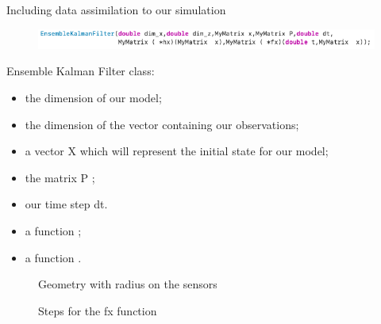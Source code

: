 \begin{frame}[allowframebreaks]{Including data assimilation to our simulation}
\begin{minipage}{1\linewidth}
    \begin{figure}
        \centering
        \includegraphics[width=\linewidth]{"images/enkf/enkf.png"}
    \end{figure}
\end{minipage}
Ensemble Kalman Filter class:
\begin{itemize}
    \item the dimension of our model;
    \item the dimension of the vector containing our observations;
    \item a vector X which will represent the initial state for our model;
    \item the matrix P ;
    \item our time step dt. 
    \item a function ;
    \item a function .

\end{itemize}
\newpage
\begin{minipage}{0.4\hsize}
			\centering
		\begin{figure}[H]
		\caption{Geometry with radius on the sensors}
	\end{figure}
		\end{minipage} \quad
		\begin{minipage}{0.4\hsize}
		\begin{figure}[H]
		\caption{Steps for the fx function}
		\end{figure}
		\end{minipage}



\end{frame}




